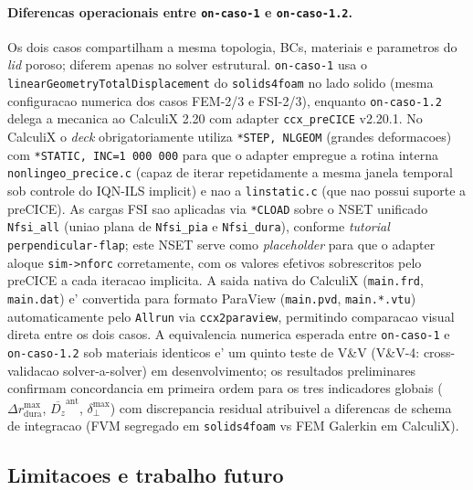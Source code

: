 \paragraph{Diferencas operacionais entre \texttt{on-caso-1} e \texttt{on-caso-1.2}.} Os dois casos compartilham a mesma topologia, BCs, materiais e parametros do \emph{lid} poroso; diferem apenas no solver estrutural. \texttt{on-caso-1} usa o \texttt{linearGeometryTotalDisplacement} do \texttt{solids4foam} no lado solido (mesma configuracao numerica dos casos FEM-2/3 e FSI-2/3), enquanto \texttt{on-caso-1.2} delega a mecanica ao CalculiX 2.20 com adapter \texttt{ccx\_preCICE} v2.20.1. No CalculiX o \emph{deck} obrigatoriamente utiliza \texttt{*STEP, NLGEOM} (grandes deformacoes) com \texttt{*STATIC, INC=1\,000\,000} para que o adapter empregue a rotina interna \texttt{nonlingeo\_precice.c} (capaz de iterar repetidamente a mesma janela temporal sob controle do IQN-ILS implicit) e nao a \texttt{linstatic.c} (que nao possui suporte a preCICE). As cargas FSI sao aplicadas via \texttt{*CLOAD} sobre o NSET unificado \texttt{Nfsi\_all} (uniao plana de \texttt{Nfsi\_pia} e \texttt{Nfsi\_dura}), conforme \emph{tutorial} \texttt{perpendicular-flap}; este NSET serve como \emph{placeholder} para que o adapter aloque \texttt{sim->nforc} corretamente, com os valores efetivos sobrescritos pelo preCICE a cada iteracao implicita. A saida nativa do CalculiX (\texttt{main.frd}, \texttt{main.dat}) e' convertida para formato ParaView (\texttt{main.pvd}, \texttt{main.*.vtu}) automaticamente pelo \texttt{Allrun} via \texttt{ccx2paraview}, permitindo comparacao visual direta entre os dois casos. A equivalencia numerica esperada entre \texttt{on-caso-1} e \texttt{on-caso-1.2} sob materiais identicos e' um quinto teste de V\&V (V\&V-4: cross-validacao solver-a-solver) em desenvolvimento; os resultados preliminares confirmam concordancia em primeira ordem para os tres indicadores globais ($\Delta r_{\mathrm{dura}}^{\max}$, $\overline{D_z}^{\mathrm{ant}}$, $\delta_{\perp}^{\max}$) com discrepancia residual atribuivel a diferencas de schema de integracao (FVM segregado em \texttt{solids4foam} vs FEM Galerkin em CalculiX).

\subsection{Limitacoes e trabalho futuro}
\label{sec:resultados-trabalho-futuro}

